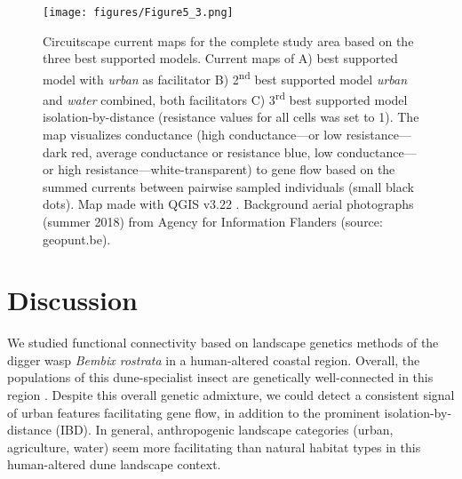 \documentclass[10pt, twoside]{book} %
\begin{document}
		\begin{figure}[h!]
			\begin{center}
				\texttt{[image: figures/Figure5\_3.png]}
			\end{center}
			\begin{footnotesize}
				\caption{Circuitscape current maps for the complete study area based on the three best supported models. Current maps of A) best supported model with \textit{urban} as facilitator B) 2\textsuperscript{nd} best supported model \textit{urban} and \textit{water} combined, both facilitators C) 3\textsuperscript{rd} best supported model isolation-by-distance (resistance values for all cells was set to 1). The map visualizes conductance (high conductance---or low resistance---dark red, average conductance or resistance blue, low conductance---or high resistance---white-transparent) to gene flow based on the summed currents between pairwise sampled individuals (small black dots). Map made with QGIS v3.22 \citep{qgisdevelopmentteam2020}. Background aerial photographs (summer 2018) from Agency for Information Flanders (source: geopunt.be). \label{fig5.3}}
			\end{footnotesize}
		\end{figure}
	\clearpage
	
	\section{Discussion}
	We studied functional connectivity based on landscape genetics methods of the digger wasp \textit{Bembix rostrata} in a human-altered coastal region. Overall, the populations of this dune-specialist insect are genetically well-connected in this region \citep[chapter \ref{chapter4}]{batsleer2022b}. Despite this overall genetic admixture, we could detect a consistent signal of urban features facilitating gene flow, in addition to the prominent isolation-by-distance (IBD). In general, anthropogenic landscape categories (urban, agriculture, water) seem more facilitating than natural habitat types in this human-altered dune landscape context.\\
	
\end{document}
